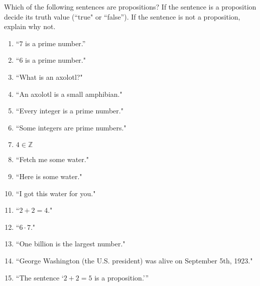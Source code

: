 \begin{xca}
		Which of the following sentences are propositions?  If the sentence is a proposition decide its truth value (``true" or ``false'').  If the sentence is not a proposition, explain why not.
		\begin{enumerate}
				\item ``$7$ is a prime number.''
				\item ``$6$ is a prime number."
				\item ``What is an axolotl?"
				\item ``An axolotl is a small amphibian."
				\item ``Every integer is a prime number."
				\item ``Some integers are prime numbers."
				\item  $4 \in \mathbb{Z}$
				\item ``Fetch me some water."
				\item ``Here is some water."
				\item ``I got this water for you."
				\item ``$2+2 = 4$."
				\item ``$6 \cdot 7$."
				\item ``One billion is the largest number."
				\item ``George Washington (the U.S. president) was alive on September 5th, 1923."
				\item ``The sentence `$2+2 = 5$ is a proposition.'''
			\end{enumerate}
	\end{xca}

